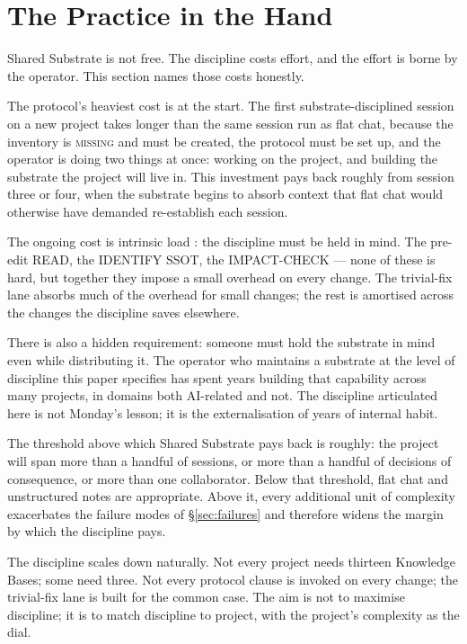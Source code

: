 \documentclass[11pt,a4paper,twocolumn]{article}
\begin{document}
\section{The Practice in the Hand}
\label{sec:practice}

Shared Substrate is not free. The discipline costs effort,
and the effort is borne by the operator. This section names
those costs honestly.

The protocol's heaviest cost is at the start. The first
substrate-disciplined session on a new project takes longer than
the same session run as flat chat, because the inventory is
\textsc{missing} and must be created, the protocol must be set up,
and the operator is doing two things at once: working on the
project, and building the substrate the project will live in.
This investment pays back roughly from session three or four,
when the substrate begins to absorb context that flat chat would
otherwise have demanded re-establish each session.

The ongoing cost is intrinsic load \citep{sweller1988cognitive}:
the discipline must be held in mind. The pre-edit READ, the
IDENTIFY SSOT, the IMPACT-CHECK --- none of these is hard, but
together they impose a small overhead on every change. The
trivial-fix lane absorbs much of the overhead for small changes;
the rest is amortised across the changes the discipline saves
elsewhere.

There is also a hidden requirement: someone must hold the substrate
in mind even while distributing it. The operator who maintains
a substrate at the level of discipline this paper specifies has
spent years building that capability across many projects, in
domains both AI-related and not. The discipline articulated here is
not Monday's lesson; it is the externalisation of years of internal
habit.

The threshold above which Shared Substrate pays back is
roughly: the project will span more than a handful of sessions,
or more than a handful of decisions of consequence, or more than
one collaborator. Below that threshold, flat chat and unstructured
notes are appropriate. Above it, every additional unit of
complexity exacerbates the failure modes of \S\ref{sec:failures}
and therefore widens the margin by which the discipline pays.

The discipline scales down naturally. Not every project needs
thirteen Knowledge Bases; some need three. Not every protocol
clause is invoked on every change; the trivial-fix lane is built
for the common case. The aim is not to maximise discipline; it is
to match discipline to project, with the project's complexity as
the dial.
\end{document}
